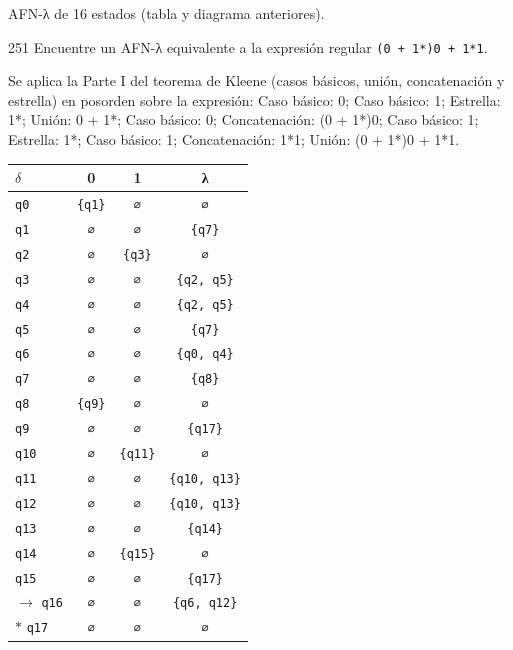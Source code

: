 \documentclass[11pt]{article}
\begin{document}
\resp AFN-λ de 16 estados (tabla y diagrama anteriores).


\begin{ejercicio}{251}{}
Encuentre un AFN-λ equivalente a la expresión regular \texttt{(0 + 1*)0 + 1*1}.
\end{ejercicio}
\proc Se aplica la Parte I del teorema de Kleene (casos básicos, unión, concatenación y estrella) en posorden sobre la expresión: Caso básico: 0; Caso básico: 1; Estrella: 1*; Unión: 0 + 1*; Caso básico: 0; Concatenación: (0 + 1*)0; Caso básico: 1; Estrella: 1*; Caso básico: 1; Concatenación: 1*1; Unión: (0 + 1*)0 + 1*1.
\begin{center}\small\begin{tabular}{lccc}\toprule
$\delta$ & 0 & 1 & λ \\\midrule
 \texttt{q0} & \texttt{\{q1\}} & \texttt{∅} & \texttt{∅} \\
 \texttt{q1} & \texttt{∅} & \texttt{∅} & \texttt{\{q7\}} \\
 \texttt{q2} & \texttt{∅} & \texttt{\{q3\}} & \texttt{∅} \\
 \texttt{q3} & \texttt{∅} & \texttt{∅} & \texttt{\{q2, q5\}} \\
 \texttt{q4} & \texttt{∅} & \texttt{∅} & \texttt{\{q2, q5\}} \\
 \texttt{q5} & \texttt{∅} & \texttt{∅} & \texttt{\{q7\}} \\
 \texttt{q6} & \texttt{∅} & \texttt{∅} & \texttt{\{q0, q4\}} \\
 \texttt{q7} & \texttt{∅} & \texttt{∅} & \texttt{\{q8\}} \\
 \texttt{q8} & \texttt{\{q9\}} & \texttt{∅} & \texttt{∅} \\
 \texttt{q9} & \texttt{∅} & \texttt{∅} & \texttt{\{q17\}} \\
 \texttt{q10} & \texttt{∅} & \texttt{\{q11\}} & \texttt{∅} \\
 \texttt{q11} & \texttt{∅} & \texttt{∅} & \texttt{\{q10, q13\}} \\
 \texttt{q12} & \texttt{∅} & \texttt{∅} & \texttt{\{q10, q13\}} \\
 \texttt{q13} & \texttt{∅} & \texttt{∅} & \texttt{\{q14\}} \\
 \texttt{q14} & \texttt{∅} & \texttt{\{q15\}} & \texttt{∅} \\
 \texttt{q15} & \texttt{∅} & \texttt{∅} & \texttt{\{q17\}} \\
$\to$ \texttt{q16} & \texttt{∅} & \texttt{∅} & \texttt{\{q6, q12\}} \\
$*$ \texttt{q17} & \texttt{∅} & \texttt{∅} & \texttt{∅} \\
\bottomrule\end{tabular}\end{center}
\end{document}

